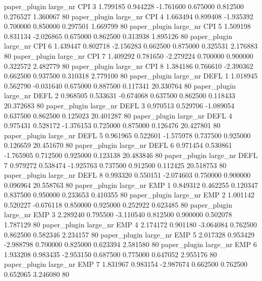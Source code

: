 paper_plugin   large_nr      CPI                 3  1.799185  0.944228  -1.761600 0.675000 0.812500  0.276527    1.360067 80
paper_plugin   large_nr      CPI                 4  1.663494  0.899408  -1.935392 0.700000 0.850000  0.297501    1.669799 80
paper_plugin   large_nr      CPI                 5  1.509198  0.831134  -2.026865 0.675000 0.862500  0.313938    1.895126 80
paper_plugin   large_nr      CPI                 6  1.439447  0.802718  -2.156283 0.662500 0.875000  0.325531    2.176883 80
paper_plugin   large_nr      CPI                 7  1.409292  0.781650  -2.279224 0.700000 0.900000  0.322572    2.482779 80
paper_plugin   large_nr      CPI                 8  1.384186  0.766610  -2.390362 0.662500 0.937500  0.310318    2.779100 80
paper_plugin   large_nr     DEFL                 1  1.018945  0.562790  -0.031640 0.675000 0.887500  0.117341   20.330764 80
paper_plugin   large_nr     DEFL                 2  0.968505  0.533631  -0.674068 0.637500 0.862500  0.118433   20.372683 80
paper_plugin   large_nr     DEFL                 3  0.970513  0.529706  -1.089054 0.637500 0.862500  0.125023   20.401287 80
paper_plugin   large_nr     DEFL                 4  0.975431  0.528172  -1.376153 0.725000 0.875000  0.126476   20.427801 80
paper_plugin   large_nr     DEFL                 5  0.961965  0.522601  -1.575978 0.737500 0.925000  0.126659   20.451670 80
paper_plugin   large_nr     DEFL                 6  0.971454  0.530861  -1.765905 0.712500 0.925000  0.123138   20.483846 80
paper_plugin   large_nr     DEFL                 7  0.979272  0.538474  -1.925763 0.737500 0.912500  0.112425   20.518753 80
paper_plugin   large_nr     DEFL                 8  0.993320  0.550151  -2.074603 0.750000 0.900000  0.096964   20.558763 80
paper_plugin   large_nr      EMP                 1  0.849312  0.462255   0.120347 0.837500 0.950000  0.233653    0.410355 80
paper_plugin   large_nr      EMP                 2  1.001142  0.520227  -0.676118 0.850000 0.925000  0.252922    0.623485 80
paper_plugin   large_nr      EMP                 3  2.289240  0.795500  -3.110540 0.812500 0.900000  0.502078    1.787129 80
paper_plugin   large_nr      EMP                 4  2.174172  0.901180  -3.064084 0.762500 0.862500  0.582346    2.234157 80
paper_plugin   large_nr      EMP                 5  2.017328  0.953429  -2.988798 0.700000 0.825000  0.623394    2.581580 80
paper_plugin   large_nr      EMP                 6  1.933208  0.983435  -2.953150 0.687500 0.775000  0.647052    2.955176 80
paper_plugin   large_nr      EMP                 7  1.831967  0.983154  -2.987674 0.662500 0.762500  0.652065    3.246080 80
